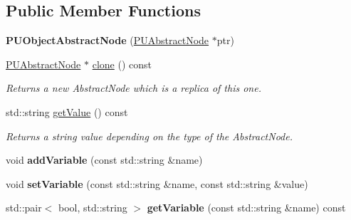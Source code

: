 \subsection*{Public Member Functions}
\begin{DoxyCompactItemize}
\item 
\mbox{\label{classPUObjectAbstractNode_a5260a002c871862d772305b4ee25973d}} 
{\bfseries P\+U\+Object\+Abstract\+Node} (\hyperlink{classPUAbstractNode}{P\+U\+Abstract\+Node} $\ast$ptr)
\item 
\mbox{\label{classPUObjectAbstractNode_a1062e4be412211c6fbd50b71be7880b6}} 
\hyperlink{classPUAbstractNode}{P\+U\+Abstract\+Node} $\ast$ \hyperlink{classPUObjectAbstractNode_a1062e4be412211c6fbd50b71be7880b6}{clone} () const
\begin{DoxyCompactList}\small\item\em Returns a new Abstract\+Node which is a replica of this one. \end{DoxyCompactList}\item 
\mbox{\label{classPUObjectAbstractNode_a859fc9b0562660a77a118ae3d1983737}} 
std\+::string \hyperlink{classPUObjectAbstractNode_a859fc9b0562660a77a118ae3d1983737}{get\+Value} () const
\begin{DoxyCompactList}\small\item\em Returns a string value depending on the type of the Abstract\+Node. \end{DoxyCompactList}\item 
\mbox{\label{classPUObjectAbstractNode_ad7b08c7a0897e919aa7d1e0be78c306f}} 
void {\bfseries add\+Variable} (const std\+::string \&name)
\item 
\mbox{\label{classPUObjectAbstractNode_ae98fd5a241df53c34c231b45749d5e89}} 
void {\bfseries set\+Variable} (const std\+::string \&name, const std\+::string \&value)
\item 
\mbox{\label{classPUObjectAbstractNode_a8846fff312dc5313d91d61a1bc163ce2}} 
std\+::pair$<$ bool, std\+::string $>$ {\bfseries get\+Variable} (const std\+::string \&name) const
\item 
\mbox{\label{classPUObjectAbstractNode_af973493769ce990a497d9d8ba6c2bdec}} 

\end{DoxyCompactItemize}
